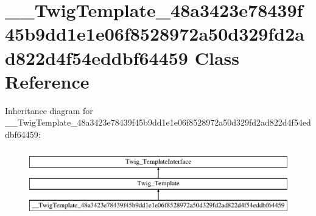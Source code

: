 \hypertarget{class_____twig_template__48a3423e78439f45b9dd1e1e06f8528972a50d329fd2ad822d4f54eddbf64459}{}\section{\+\_\+\+\_\+\+Twig\+Template\+\_\+48a3423e78439f45b9dd1e1e06f8528972a50d329fd2ad822d4f54eddbf64459 Class Reference}
\label{class_____twig_template__48a3423e78439f45b9dd1e1e06f8528972a50d329fd2ad822d4f54eddbf64459}
Inheritance diagram for \+\_\+\+\_\+\+Twig\+Template\+\_\+48a3423e78439f45b9dd1e1e06f8528972a50d329fd2ad822d4f54eddbf64459\+:\begin{figure}[H]
\begin{center}
\leavevmode
\includegraphics[height=3.000000cm]{class_____twig_template__48a3423e78439f45b9dd1e1e06f8528972a50d329fd2ad822d4f54eddbf64459}
\end{center}
\end{figure}
